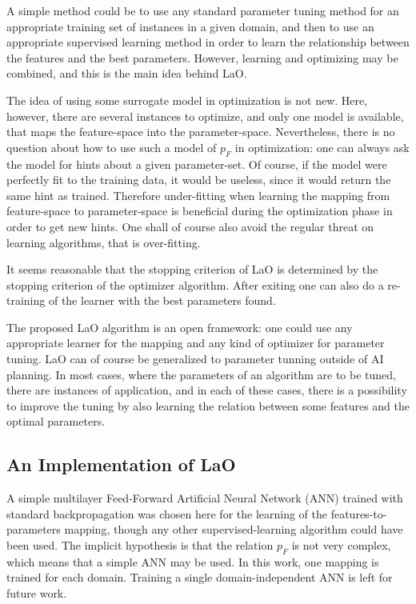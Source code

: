 \documentclass[runningheads,a4paper]{llncs}
\begin{document}
A simple method could be to use any standard parameter tuning method for an appropriate training set of instances in a given domain, and then to use an appropriate supervised learning method in order to learn the relationship between the features and the best parameters. However, learning and optimizing may be combined, and this is the main idea behind LaO.

The idea of using some surrogate model in optimization is not new. Here, however, there are  several instances to optimize, and only one model is available, that maps the feature-space into the parameter-space. Nevertheless, there is no question about how to use such a model of \begin{math}p_F\end{math} in optimization: one can always ask the model for hints about a given parameter-set. Of course, if the model were perfectly fit to the training data, it would be useless, since it would return the same hint as trained. Therefore under-fitting when learning the mapping from feature-space to parameter-space is beneficial during the optimization phase in order to get new hints. One shall of course also avoid the regular threat on learning algorithms, that is over-fitting.

It seems reasonable that the stopping criterion of LaO is determined by the stopping criterion of the optimizer algorithm. After exiting one can also do a re-training of the learner with the best parameters found.

The proposed LaO algorithm is an open framework: one could use any appropriate learner for the mapping and any kind of optimizer for parameter tuning. LaO can of course be generalized to parameter tunning outside of AI planning. In most cases, where the parameters of an algorithm are to be tuned, there are instances of application, and in each of these cases, there is a possibility to improve the tuning by also learning the relation between some features and the optimal parameters.

\subsection{An Implementation of LaO}

A simple multilayer Feed-Forward Artificial Neural Network (ANN) trained with standard backpropagation was chosen here for the learning of the features-to-parameters mapping, though any other supervised-learning algorithm could have been used. The implicit hypothesis is that the relation \begin{math}p_F\end{math} is not very complex, which means that a simple ANN may be used. In this work, one mapping is trained for each domain. Training a single domain-independent ANN is left for future work.
\end{document}
